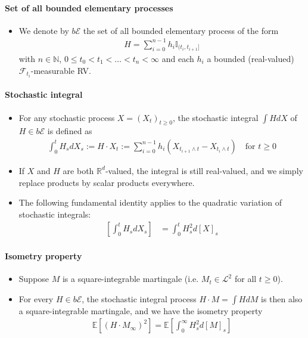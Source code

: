 \documentclass[a4paper,landscape,8pt,fleqn]{scrartcl}
\begin{document}
\begin{multicols*}{3}
\paragraph{Set of all bounded elementary processes}

\begin{itemize}
\item We denote by $b \mathcal{E}$ the set of all bounded elementary process of the form
\begin{align*}
H = \sum_{i=0}^{n-1} h_i \mathbb{I}_{(t_i,t_{i+1}]}
\end{align*}
with $n \in \mathbb{N}$, $0 \leq t_0 < t_1 < \ldots < t_n < \infty$ and each $h_i$ a bounded (real-valued) $\mathcal{F}_{t_i}$-measurable RV.
\end{itemize}

\paragraph{Stochastic integral}

\begin{itemize}
\item For any stochastic process $X = (X_t)_{t \geq 0}$, the stochastic integral $\int H dX$ of $H \in b \mathcal{E}$ is defined as
\begin{align*}
\int_0^t H_s dX_s := H \cdot X_t := \sum_{i=0}^{n-1} h_i \left( X_{t_{i+1} \wedge t} - X_{t_i \wedge t} \right) \quad \text{for } t \geq 0
\end{align*}
\item If $X$ and $H$ are both $\mathbb{R}^d$-valued, the integral is still real-valued, and we simply replace products by scalar products everywhere.
\item The following fundamental identity applies to the quadratic variation of stochastic integrals:
\begin{align*}
\left[ \int_0^t H_s dX_s \right] &= \int_0^t H_s^2 d[X]_s
\end{align*}
\end{itemize}

\paragraph{Isometry property}

\begin{itemize}
\item Suppose $M$ is a square-integrable martingale (i.e. $M_t \in \mathcal{L}^2$ for all $t \geq 0$).
\item For every $H \in b \mathcal{E}$, the stochastic integral process $H \cdot M = \int H dM$ is then also a square-integrable martingale, and we have the isometry property
\begin{align*}
\mathbb{E} \left[ (H \cdot M_\infty)^2 \right] = \mathbb{E} \left[ \int_0^\infty H_s^2 d[M]_s \right]
\end{align*}
\end{itemize}


\end{multicols*}
\end{document}
